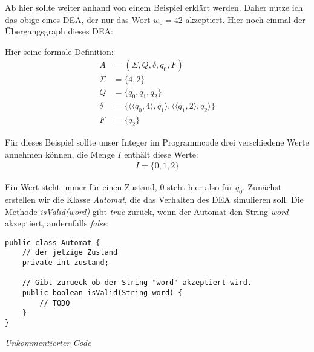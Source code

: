 \begin{flushleft}
Ab hier sollte weiter anhand von einem Beispiel erklärt werden.
Daher nutze ich das obige  eines DEA,
der nur das Wort $w_0=42$ akzeptiert.
Hier noch einmal der Übergangsgraph dieses DEA:
\end{flushleft}

\begin{center}
\end{center}

\begin{flushleft}
Hier seine formale Definition:
\begin{align}
    A &= (\Sigma,Q,\delta,q_0,F) \\
    \Sigma &= \{4,2\} \\
    Q &= \{q_0,q_1,q_2\} \\
    \delta &= \{\langle \langle q_0, 4 \rangle, q_1 \rangle, \langle \langle q_1, 2 \rangle, q_2 \rangle \} \\
    F &= \{q_2\}
\end{align}

Für dieses Beispiel sollte unser Integer im Programmcode
drei verschiedene Werte annehmen können,
die Menge $I$ enthält diese Werte:
\begin{align}
    I=\{0,1,2\}
\end{align}

Ein Wert steht immer für einen Zustand, $0$ steht hier also für $q_0$.
Zunächst erstellen wir die Klasse \textit{Automat},
die das Verhalten des DEA simulieren soll.
Die Methode \textit{isValid(word)} gibt \textit{true}
zurück, wenn der Automat den String
\textit{word} akzeptiert, andernfalls \textit{false}:
\end{flushleft}

\begin{center}  
\begin{lstlisting}
public class Automat {
    // der jetzige Zustand
    private int zustand;

    // Gibt zurueck ob der String "word" akzeptiert wird.
    public boolean isValid(String word) {
        // TODO
    }
}
\end{lstlisting}
\href{https://raw.githubusercontent.com/tim-tm/articles/refs/heads/main/informatik-notes/code/Automat.java}{\textit{Unkommentierter Code}} \\
\end{center}

